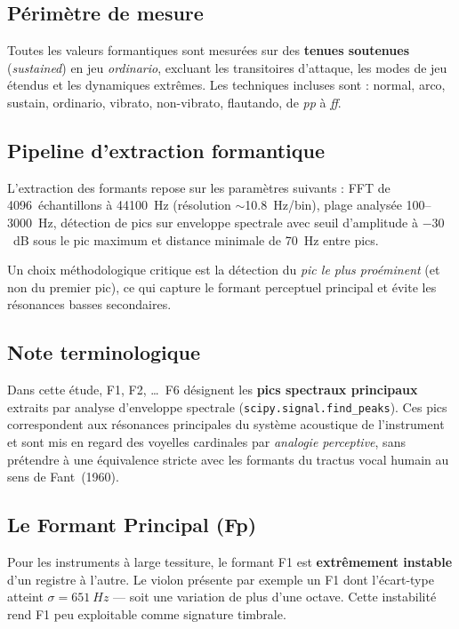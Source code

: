 \documentclass[11pt,a4paper]{article}
\begin{document}
\subsection{Périmètre de mesure}

Toutes les valeurs formantiques sont mesurées sur des \textbf{tenues
soutenues} (\emph{sustained}) en jeu \emph{ordinario}, excluant les
transitoires d'attaque, les modes de jeu étendus et les dynamiques
extrêmes. Les techniques incluses sont : normal, arco, sustain,
ordinario, vibrato, non-vibrato, flautando, de \emph{pp} à \emph{ff}.

\subsection{Pipeline d'extraction formantique}

L'extraction des formants repose sur les paramètres suivants : FFT de
\num{4096}~échantillons à \SI{44100}{Hz} (résolution
$\sim$\SI{10.8}{Hz/bin}), plage analysée 100--\SI{3000}{Hz}, détection
de pics sur enveloppe spectrale avec seuil d'amplitude à $-30$~dB sous
le pic maximum et distance minimale de \SI{70}{Hz} entre pics.

Un choix méthodologique critique est la détection du \emph{pic le plus
proéminent} (et non du premier pic), ce qui capture le formant perceptuel
principal et évite les résonances basses secondaires.

\subsection{Note terminologique}

Dans cette étude, F1, F2, \ldots\ F6 désignent les \textbf{pics
spectraux principaux} extraits par analyse d'enveloppe spectrale
(\texttt{scipy.signal.find\_peaks}). Ces pics correspondent aux
résonances principales du système acoustique de l'instrument et sont mis
en regard des voyelles cardinales par \emph{analogie perceptive}, sans
prétendre à une équivalence stricte avec les formants du tractus vocal
humain au sens de Fant~(1960).

\subsection{Le Formant Principal (Fp)}

Pour les instruments à large tessiture, le formant F1 est
\textbf{extrêmement instable} d'un registre à l'autre. Le violon
présente par exemple un F1 dont l'écart-type atteint $\sigma =
\SI{651}{Hz}$ --- soit une variation de plus d'une octave. Cette
instabilité rend F1 peu exploitable comme signature timbrale.
\end{document}
